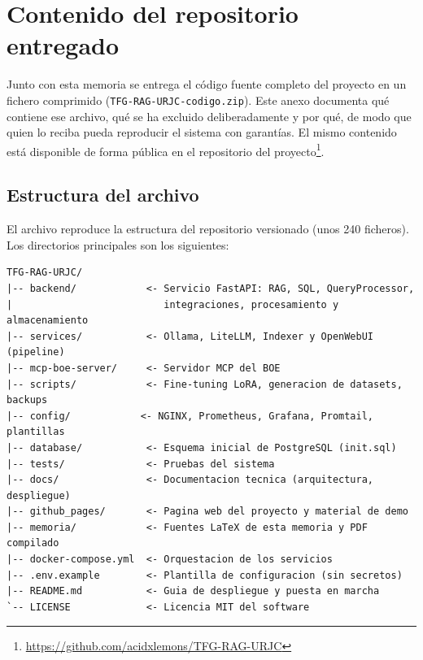 \chapter{Contenido del repositorio entregado}
\label{anexo:repositorio}

Junto con esta memoria se entrega el código fuente completo del proyecto en un fichero comprimido (\texttt{TFG-RAG-URJC-codigo.zip}). Este anexo documenta qué contiene ese archivo, qué se ha excluido deliberadamente y por qué, de modo que quien lo reciba pueda reproducir el sistema con garantías. El mismo contenido está disponible de forma pública en el repositorio del proyecto\footnote{\url{https://github.com/acidxlemons/TFG-RAG-URJC}}.

\section{Estructura del archivo}

El archivo reproduce la estructura del repositorio versionado (unos 240 ficheros). Los directorios principales son los siguientes:

\begin{lstlisting}[numbers=none, basicstyle=\ttfamily\footnotesize, caption={Contenido principal del archivo entregado.}, label={lst:contenido-zip}]
TFG-RAG-URJC/
|-- backend/            <- Servicio FastAPI: RAG, SQL, QueryProcessor,
|                          integraciones, procesamiento y almacenamiento
|-- services/           <- Ollama, LiteLLM, Indexer y OpenWebUI (pipeline)
|-- mcp-boe-server/     <- Servidor MCP del BOE
|-- scripts/            <- Fine-tuning LoRA, generacion de datasets, backups
|-- config/            <- NGINX, Prometheus, Grafana, Promtail, plantillas
|-- database/           <- Esquema inicial de PostgreSQL (init.sql)
|-- tests/              <- Pruebas del sistema
|-- docs/               <- Documentacion tecnica (arquitectura, despliegue)
|-- github_pages/       <- Pagina web del proyecto y material de demo
|-- memoria/            <- Fuentes LaTeX de esta memoria y PDF compilado
|-- docker-compose.yml  <- Orquestacion de los servicios
|-- .env.example        <- Plantilla de configuracion (sin secretos)
|-- README.md           <- Guia de despliegue y puesta en marcha
`-- LICENSE             <- Licencia MIT del software
\end{lstlisting}

